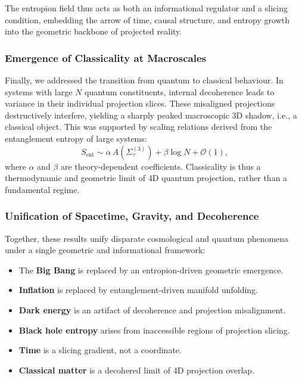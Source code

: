 \documentclass[12pt]{article}
\begin{document}
The entropion field thus acts as both an informational regulator and a slicing condition, embedding the arrow of time, causal structure, and entropy growth into the geometric backbone of projected reality.

\subsubsection*{Emergence of Classicality at Macroscales}

Finally, we addressed the transition from quantum to classical behaviour. In systems with large $N$ quantum constituents, internal decoherence leads to variance in their individual projection slices. These misaligned projections destructively interfere, yielding a sharply peaked macroscopic 3D shadow, i.e., a classical object. This was supported by scaling relations derived from the entanglement entropy of large systems:
\begin{equation}
S_{\text{ent}} \sim \alpha \, A(\Sigma^{(3)}_\tau) + \beta \log N + \mathcal{O}(1),
\label{eq:entanglement-scaling}
\end{equation}
where $\alpha$ and $\beta$ are theory-dependent coefficients. Classicality is thus a thermodynamic and geometric limit of 4D quantum projection, rather than a fundamental regime.

\subsubsection*{Unification of Spacetime, Gravity, and Decoherence}

Together, these results unify disparate cosmological and quantum phenomena under a single geometric and informational framework:

\begin{itemize}
    \item The \textbf{Big Bang} is replaced by an entropion-driven geometric emergence.
    \item \textbf{Inflation} is replaced by entanglement-driven manifold unfolding.
    \item \textbf{Dark energy} is an artifact of decoherence and projection misalignment.
    \item \textbf{Black hole entropy} arises from inaccessible regions of projection slicing.
    \item \textbf{Time} is a slicing gradient, not a coordinate.
    \item \textbf{Classical matter} is a decohered limit of 4D projection overlap.
\end{itemize}
\end{document}
